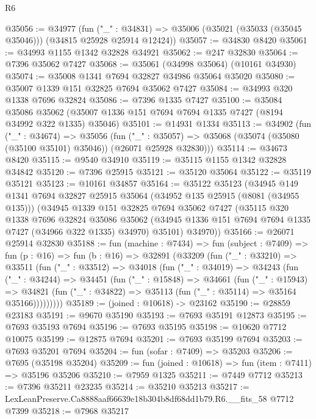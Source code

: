 \begin{lexlean}{R6}
\begin{coremodule}
@35056 := @34977
    (fun ("_" : @34831) => @35006 (@35021 (@35033 (@35045 @35046))) (@34815 @25928 @25914 @12424))
@35057 := @34830 @8420
@35061 := @34993 @1155 @1342 @32828 @34921
@35062 := @247 @32830
@35064 := @7396 @35062 @7427
@35068 := @35061 (@34998 @35064) (@10161 @34930)
@35074 := @35008 @1341 @7694 @32827 @34986 @35064 @35020
@35080 := @35007 @1339 @151 @32825 @7694 @35062 @7427
@35084 := @34993 @320 @1338 @7696 @32824
@35086 := @7396 @1335 @7427
@35100 := @35084
    @35086
    @35062
    (@35007 @1336 @151 @7694 @7694 @1335 @7427 (@8194 @34992 @322 @1335) @35046)
@35101 := @14931 @1334
@35113 := @34902
    (fun ("_" : @34674) =>
    @35056
      (fun ("_" : @35057) =>
      @35068 (@35074 (@35080 (@35100 @35101) @35046)) (@26071 @25928 @32830)))
@35114 := @34673 @8420
@35115 := @9540 @34910
@35119 := @35115 @1155 @1342 @32828 @34842
@35120 := @7396 @25915
@35121 := @35120 @35064
@35122 := @35119 @35121
@35123 := @10161 @34857
@35164 := @35122
    @35123
    (@34945
      @149
      @1341
      @7694
      @32827
      @25915
      @35064
      (@34952 @135 @25915 (@8081 (@34955 @135)))
      (@34945
        @1339
        @151
        @32825
        @7694
        @35062
        @7427
        (@35115
          @320
          @1338
          @7696
          @32824
          @35086
          @35062
          (@34945 @1336 @151 @7694 @7694 @1335 @7427 (@34966 @322 @1335) @34970)
          @35101)
        @34970))
@35166 := @26071 @25914 @32830
@35188 := fun (machine : @7434) =>
  fun (subject : @7409) =>
  fun (p : @16) =>
  fun (b : @16) =>
  @32891
    (@33209
      (fun ("_" : @33210) =>
      @33511
        (fun ("_" : @33512) =>
        @34018
          (fun ("_" : @34019) =>
          @34243
            (fun ("_" : @34244) =>
            @34451
              (fun ("_" : @15848) =>
              @34661
                (fun ("_" : @15943) =>
                @34821 (fun ("_" : @34822) => @35113 (fun ("_" : @35114) => @35164 @35166)))))))))
@35189 := (joined : @10618) -> @23162
@35190 := @28859 @23183
@35191 := @9670 @35190
@35193 := @7693 @35191 @12873
@35195 := @7693 @35193 @7694
@35196 := @7693 @35195
@35198 := @10620 @7712 @10075
@35199 := @12875 @7694
@35201 := @7693 @35199 @7694
@35203 := @7693 @35201 @7694
@35204 := fun (sofar : @7409) => @35203
@35206 := @7695 (@35198 @35204)
@35209 := fun (joined : @10618) => fun (item : @7411) => @35196 @35206
@35210 := @7959 @1325
@35211 := @7449 @7712
@35213 := @7396 @35211 @23235
@35214 := @35210 @35213
@35217 := LexLeanPreserve.Ca8888aaf66639e18b304b8df68dd1b79.R6.__fits_58 @7712 @7399
@35218 := @7968 @35217

\end{coremodule}
\end{lexlean}
